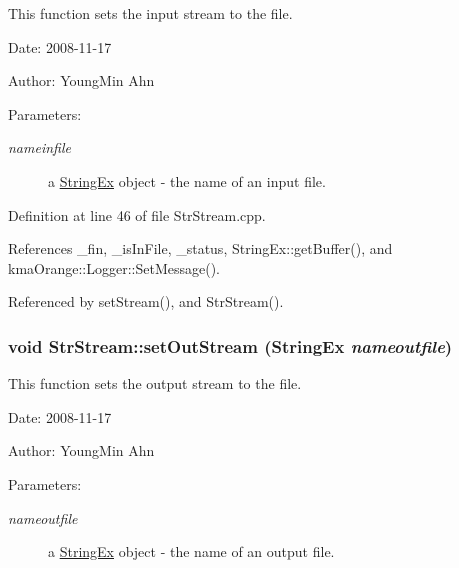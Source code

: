 This function sets the input stream to the file. 

\begin{Desc}
\item[Date:]2008-11-17 \end{Desc}
\begin{Desc}
\item[Author:]YoungMin Ahn \end{Desc}
\begin{Desc}
\item[Parameters:]
\begin{description}
\item[{\em nameinfile}]a \hyperlink{classStringEx}{StringEx} object - the name of an input file. \end{description}
\end{Desc}


Definition at line 46 of file StrStream.cpp.

References \_\-fin, \_\-isInFile, \_\-status, StringEx::getBuffer(), and kmaOrange::Logger::SetMessage().

Referenced by setStream(), and StrStream().\hypertarget{classkmaOrange_1_1StrStream_afc296be71f9d177e34e658e97ec64bd}{
\subsubsection[{setOutStream}]{\setlength{\rightskip}{0pt plus 5cm}void StrStream::setOutStream ({\bf StringEx} {\em nameoutfile})}}
\label{classkmaOrange_1_1StrStream_afc296be71f9d177e34e658e97ec64bd}


This function sets the output stream to the file. 

\begin{Desc}
\item[Date:]2008-11-17 \end{Desc}
\begin{Desc}
\item[Author:]YoungMin Ahn \end{Desc}
\begin{Desc}
\item[Parameters:]
\begin{description}
\item[{\em nameoutfile}]a \hyperlink{classStringEx}{StringEx} object - the name of an output file. \end{description}
\end{Desc}


